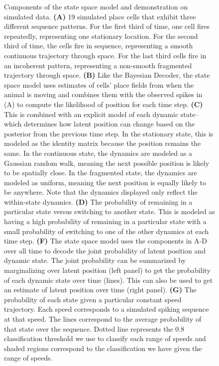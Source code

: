 \documentclass[times, twoside]{zHenriquesLab-StyleBioRxiv}
\begin{document}
\begin{figure}
\caption{Components of the state space model and demonstration on simulated data. \textbf{(A)} 19 simulated place cells that exhibit three different sequence patterns. For the first third of time, one cell fires repeatedly, representing one stationary location. For the second third of time, the cells fire in sequence, representing a smooth continuous trajectory through space. For the last third cells fire in an incoherent pattern, representing a non-smooth fragmented trajectory through space. \textbf{(B)} Like the Bayesian Decoder, the state space model uses estimates of cells' place fields from when the animal is moving and combines them with the observed spikes in (A) to compute the likelihood of position for each time step. \textbf{(C)} This is combined with an explicit model of each dynamic state--which determines how latent position can change based on the posterior from the previous time step. In the stationary state, this is modeled as the identity matrix because the position remains the same. In the continuous state, the dynamics are modeled as a Gaussian random walk, meaning the next possible position is likely to be spatially close. In the fragmented state, the dynamics are modeled as uniform, meaning the next position is equally likely to be anywhere. Note that the dynamics displayed only reflect the within-state dynamics. \textbf{(D)} The probability of remaining in a particular state versus switching to another state. This is modeled as having a high probability of remaining in a particular state with a small probability of switching to one of the other dynamics at each time step. \textbf{(F)} The state space model uses the components in A-D over all time to decode the joint probability of latent position and dynamic state. The joint probability can be summarized by marginalizing over latent position (left panel) to get the probability of each dynamic state over time (lines). This can also be used to get an estimate of latent position over time (right panel). \textbf{(G)} The probability of each state given a particular constant speed trajectory. Each speed corresponds to a simulated spiking sequence at that speed. The lines correspond to the average probability of that state over the sequence. Dotted line represents the 0.8 classification threshold we use to classify each range of speeds and shaded regions correspond to the classification we have given the range of speeds.
}
\label{1}
\end{figure}
\end{document}

